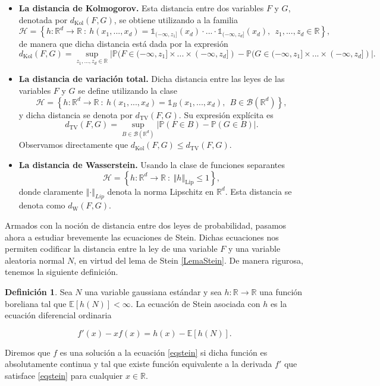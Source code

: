 \documentclass[letterpaper,twoside,12pt]{book}
\newcommand{\R}{\mathbb{R}}
\newcommand{\B}{\mathcal{B}}
\newcommand{\E}{\mathbb{E}}
\renewcommand{\P}{\mathbb{P}}
\newcommand{\1}{\mathds{1}}
\newcommand{\abs}[1]{\left\lvert #1 \right\rvert}
\renewcommand{\to}{\rightarrow}
\newcommand{\norm}[1]{\left\Vert #1 \right\Vert}
\theoremstyle{definition}
\newtheorem{dfn}{Definición}
\theoremstyle{definition}
\theoremstyle{remark}
\theoremstyle{definition}
\theoremstyle{definition}
\theoremstyle{definition}
\theoremstyle{definition}
\theoremstyle{definition}
\begin{document}
\begin{itemize}
   \item \textbf{La distancia de Kolmogorov.} Esta distancia entre dos variables $F$ y $G$, denotada por $d_{\text{Kol}}(F,G)$, se obtiene utilizando a la familia \[\mathscr{H}= \left\{h:\R^d\to \R \ :\ h(x_1,...,x_d)=\1_{(-\infty,z_1]}(x_d)\cdot ... \cdot \1_{(-\infty,z_d]}(x_d), \ \  z_1,...,z_d\in \R\right\},\]
   de manera que dicha distancia está dada por la expresión
   \[
   d_{\text{Kol}}(F,G)=\sup_{z_1,...,z_d\in \R}\abs{\P(F\in (-\infty,z_1]\times...\times(-\infty,z_d])-\P(G\in (-\infty,z_1]\times...\times(-\infty,z_d])}.
   \]
   \item \textbf{La distancia de variación total.} Dicha distancia entre las leyes de las variables $F$ y $G$ se define utilizando la clase \[\mathscr{H}=\left\{h:\R^d\to \R \ :\ h(x_1,...,x_d)=\1_B(x_1,...,x_d), \ \ B\in \B(\R^{d})\right\},\] 
   y dicha distancia se denota por $d_{\text{TV}}(F,G).$ Su expresión explícita es 
   \[
      d_{\text{TV}}(F,G)= \sup_{B\in \B(\R^{d})}\abs{\P(F\in B)-\P(G\in B)}.
   \]
   Observamos directamente que $d_{\text{Kol}}(F,G)\leq d_{\text{TV}}(F,G)$.
   \item \textbf{La distancia de Wasserstein.} Usando la clase de funciones separantes \[\mathscr{H}=\left\{h:\R^{d}\to \R \ :\ \norm{h}_{\text{Lip}}\leq 1\right\},\] donde claramente $\norm{\cdot}_{Lip}$ denota la norma Lipschitz en $\R^{d}$. Esta distancia se denota como $d_{\text{W}}(F,G)$.
\end{itemize}

Armados con la noción de distancia entre dos leyes de probabilidad, pasamos ahora a estudiar brevemente las ecuaciones de Stein. Dichas ecuaciones nos permiten codificar la distancia entre la ley de una variable $F$ y una variable aleatoria normal $N$, en virtud del lema de Stein \ref{LemaStein}. De manera rigurosa, tenemos la siguiente definición.

\begin{dfn} 
 Sea $N$ una variable gaussiana estándar y sea $h:\R\to\R$ una función boreliana tal que $\E\left[h(N)\right]<\infty$. La ecuación de Stein asociada con $h$ es la ecuación diferencial ordinaria 
 
 \begin{equation}\label{eqstein}
   f'(x)-xf(x)=h(x)-\E\left[h(N)\right].
 \end{equation}
 
 Diremos que $f$ es una solución a la ecuación \eqref{eqstein} si dicha función es absolutamente continua y tal que existe función equivalente a la derivada $f'$ que satisface \eqref{eqstein} para cualquier $x\in \R$.
 \end{dfn}
\end{document}
